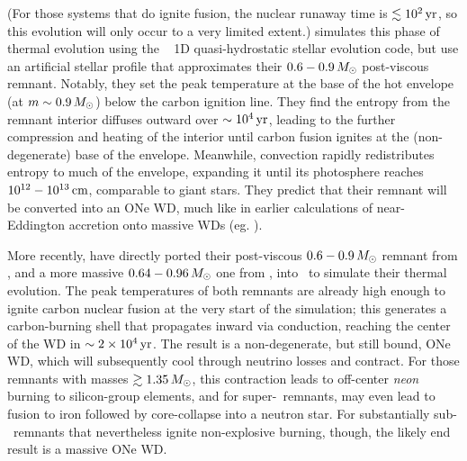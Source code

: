 \noindent (For those systems that do ignite fusion, the nuclear runaway time is $\lesssim10^2\,\mathrm{yr}$, so this evolution will only occur to a very limited extent.)  \cite{shen+12} simulates this phase of thermal evolution using the \mesa\ \citep{paxt+11, paxt+13, paxt+15} 1D quasi-hydrostatic stellar evolution code, but use an artificial stellar profile that approximates their $0.6-0.9\,\Msun$ post-viscous remnant.  Notably, they set the peak temperature at the base of the hot envelope (at $m \sim 0.9\,\Msun$) below the carbon ignition line.  They find the entropy from the remnant interior diffuses outward over $\sim10^4\,\mathrm{yr}$, leading to the further compression and heating of the interior until carbon fusion ignites at the (non-degenerate) base of the envelope.  Meanwhile, convection rapidly redistributes entropy to much of the envelope, expanding it until its photosphere reaches $10^{12}-10^{13}\,\mathrm{cm}$, comparable to giant stars.  They predict that their remnant will be converted into an ONe WD, much like in earlier calculations of near-Eddington accretion onto massive WDs (eg. \citealt{saion85}).

More recently, \cite{schw+16} have directly ported their post-viscous $0.6-0.9\,\Msun$ remnant from \cite{schw+12}, and a more massive $0.64-0.96\,\Msun$ one from \cite{rask+14}, into \mesa\ to simulate their thermal evolution.  The peak temperatures of both remnants are already high enough to ignite carbon nuclear fusion at the very start of the simulation; this generates a carbon-burning shell that propagates inward via conduction, reaching the center of the WD in $\sim2\times10^4\,\mathrm{yr}$.  The result is a non-degenerate, but still bound, ONe WD, which will subsequently cool through neutrino losses and contract.  For those remnants with masses $\gtrsim1.35\,\Msun$, this contraction leads to off-center \textit{neon} burning to silicon-group elements, and for super-\Mch\ remnants, may even lead to fusion to iron followed by core-collapse into a neutron star.  For substantially sub-\Mch\ remnants that nevertheless ignite non-explosive burning, though, the likely end result is a massive ONe WD.

